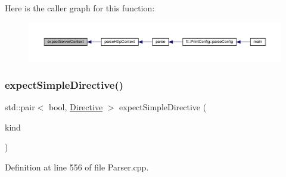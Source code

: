 Here is the caller graph for this function\+:
\nopagebreak
\begin{figure}[H]
\begin{center}
\leavevmode
\includegraphics[width=350pt]{classft_1_1_parser_a72f108d920a35284bf8f740bb8240acd_icgraph}
\end{center}
\end{figure}
\mbox{\label{classft_1_1_parser_a292bf0ed87b8e81b59cefb72c70152bd}} 
\subsubsection{\texorpdfstring{expect\+Simple\+Directive()}{expectSimpleDirective()}}
{\footnotesize\ttfamily std\+::pair$<$ bool, \hyperlink{classft_1_1_directive}{Directive} $>$ expect\+Simple\+Directive (\begin{DoxyParamCaption}\item[{enum \hyperlink{namespaceft_a5a5554dff10f0dc50bae4cc5825ad75d}{Directive\+Kind}}]{kind }\end{DoxyParamCaption})\hspace{0.3cm}{\ttfamily [private]}}



Definition at line 556 of file Parser.\+cpp.


